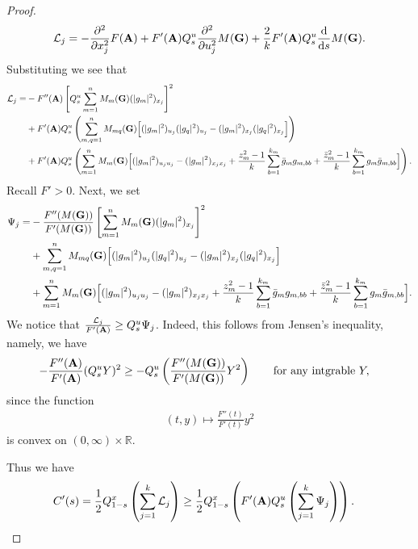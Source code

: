 \documentclass[10pt,a4paper]{amsart}
\newcommand{\R}{\mathbb{R}}
\begin{document}
\begin{proof}
\begin{align*}
			\mathcal{L}_j=-	\frac{\partial^2}{\partial x_j^2}F({\bf{A}})+  F'({\bf{A}}) Q_s^u \frac{\partial^2}{\partial u_j^2}M({\bf{G}})+\frac{2}{k}F'({\bf{A}})Q_s^u\frac{\mathrm{d}}{\mathrm{d}s}M({\bf{G}}).
		\end{align*}
		Substituting we see that
		\begin{align*}
			\mathcal{L}_j=&-F''({\bf{A}})\left[Q_s^u\sum_{m=1}^nM_{m}({\bf{G}})(|g_m|^2)_{x_j}\right]^2\\   
			&+F'({\bf{A}})Q_s^u\left(\sum_{m, q=1}^{n}M_{mq}({\bf{G}})\Big[(|g_m|^2)_{u_j}(|g_q|^2)_{u_j}-(|g_m|^2)_{x_j}(|g_q|^2)_{x_j}\Big] \right)\\
			&+F'({\bf{A}})Q_s^u\left(\sum_{m=1}^nM_{m}({\bf{G}})\Big[(|g_m|^2)_{u_ju_j}-(|g_m|^2)_{x_jx_j}+\frac{z_m^2-1}{k}\sum_{b=1}^{k_m}\bar{g}_mg_{m,bb}+\frac{\bar{z}_m^2-1}{k}\sum_{b=1}^{k_m}g_m\bar{g}_{m,bb}\Big]\right).
		\end{align*}
		Recall $F'>0$. Next, we set
		\begin{align*}
			\Psi_j=&-\frac{F''({M(\bf{G}}))}{F'(M({\bf{G}}))}\left[\sum_{m=1}^nM_{m}({\bf{G}})(|g_m|^2)_{x_j}\right]^2\\   
			&+\sum_{m, q=1}^{n}M_{mq}({\bf{G}})\Big[(|g_m|^2)_{u_j}(|g_q|^2)_{u_j}-(|g_m|^2)_{x_j}(|g_q|^2)_{x_j}\Big] \\
			&+\sum_{m=1}^nM_{m}({\bf{G}})\Big[(|g_m|^2)_{u_ju_j}-(|g_m|^2)_{x_jx_j}+\frac{z_m^2-1}{k}\sum_{b=1}^{k_m}\bar{g}_mg_{m,bb}+\frac{\bar{z}_m^2-1}{k}\sum_{b=1}^{k_m}g_m\bar{g}_{m,bb}\Big].
		\end{align*}
		We notice that $\frac{\mathcal{L}_j}{F'({\bf{A}})}\geq Q_s^u\Psi_j$. Indeed, this follows from Jensen's inequality, namely,  we have
		\begin{align*}
			- \frac{F''({\bf{A}})}{F'({\bf{A}})}(Q_s^uY)^2 &\geq- Q_{s}^{u}\left( \frac{F''(M({\bf{G}}))}{F'(M({\bf{G}}))}Y^2\right)  \qquad \text{for any intgrable} \ Y,
		\end{align*}
		since the function 
		\begin{align*}
			(t,y)\mapsto \frac{F''(t)}{F'(t)}y^2
		\end{align*}
		is convex on $(0,\infty)\times \R$. 

        Thus we have 
        \begin{align*}
            &C'(s)=\frac{1}{2}Q_{1-s}^{x}\left(\sum_{j=1}^{k} \mathcal{L}_{j}\right) \geq \frac{1}{2}Q_{1-s}^{x}\left(F'({\bf A})Q_{s}^{u} \left(\sum_{j=1}^{k} \Psi_{j} \right)\right).
        \end{align*}
        

\end{proof}
\end{document}
